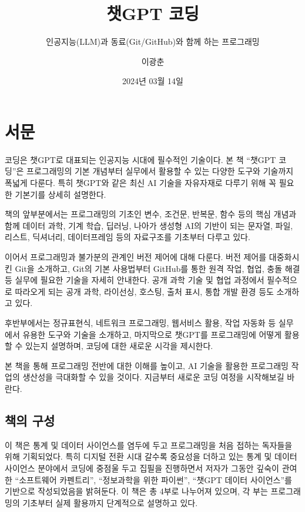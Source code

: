 \documentclass[
  letterpaper,
]{book}
\title{챗GPT 코딩}
\subtitle{인공지능(LLM)과 동료(Git/GitHub)와 함께 하는 프로그래밍}
\author{이광춘}
\date{2024년 03월 14일}
\renewcommand*\contentsname{목차}
\newcommand\contentsname{목차}
\begin{document}
\frontmatter
\maketitle

\renewcommand*\contentsname{목차}
{
\hypersetup{linkcolor=}
\setcounter{tocdepth}{1}
\tableofcontents
}
\mainmatter
{}

\chapter*{서문}\label{uxc11cuxbb38}


코딩은 챗GPT로 대표되는 인공지능 시대에 필수적인 기술이다. 본 책 ``챗GPT
코딩''은 프로그래밍의 기본 개념부터 실무에서 활용할 수 있는 다양한
도구와 기술까지 폭넓게 다룬다. 특히 챗GPT와 같은 최신 AI 기술을
자유자재로 다루기 위해 꼭 필요한 기본기를 상세히 설명한다.

책의 앞부분에서는 프로그래밍의 기초인 변수, 조건문, 반복문, 함수 등의
핵심 개념과 함께 데이터 과학, 기계 학습, 딥러닝, 나아가 생성형 AI의
기반이 되는 문자열, 파일, 리스트, 딕셔너리, 데이터프레임 등의 자료구조를
기초부터 다루고 있다.

이어서 프로그래밍과 불가분의 관계인 버전 제어에 대해 다룬다. 버전 제어를
대중화시킨 Git을 소개하고, Git의 기본 사용법부터 GitHub를 통한 원격
작업, 협업, 충돌 해결 등 실무에 필요한 기술을 자세히 안내한다. 공개 과학
기술 및 협업 과정에서 필수적으로 따라오게 되는 공개 과학, 라이선싱,
호스팅, 출처 표시, 통합 개발 환경 등도 소개하고 있다.

후반부에서는 정규표현식, 네트워크 프로그래밍, 웹서비스 활용, 작업 자동화
등 실무에서 유용한 도구와 기술을 소개하고, 마지막으로 챗GPT를
프로그래밍에 어떻게 활용할 수 있는지 설명하며, 코딩에 대한 새로운 시각을
제시한다.

본 책을 통해 프로그래밍 전반에 대한 이해를 높이고, AI 기술을 활용한
프로그래밍 작업의 생산성을 극대화할 수 있을 것이다. 지금부터 새로운 코딩
여정을 시작해보길 바란다.

\section*{책의 구성}\label{uxcc45uxc758-uxad6cuxc131}


이 책은 통계 및 데이터 사이언스를 염두에 두고 프로그래밍을 처음 접하는
독자들을 위해 기획되었다. 특히 디지털 전환 시대 갈수록 중요성을 더하고
있는 통계 및 데이터 사이언스 분야에서 코딩에 중점울 두고 집필을
진행하면서 저자가 그동안 깊숙이 관여한 ``소프트웨어
카펜트리''\autocite{gonzalez2019software}, ``정보과학을 위한
파이썬''\autocite{severance2015python}, ``챗GPT 데이터
사이언스''\autocite{lee2024sql,leeshin2023,lee2024quarto}를 기반으로
작성되었음을 밝혀둔다. 이 책은 총 4부로 나누어져 있으며, 각 부는
프로그래밍의 기초부터 실제 활용까지 단계적으로 설명하고 있다.
\end{document}
